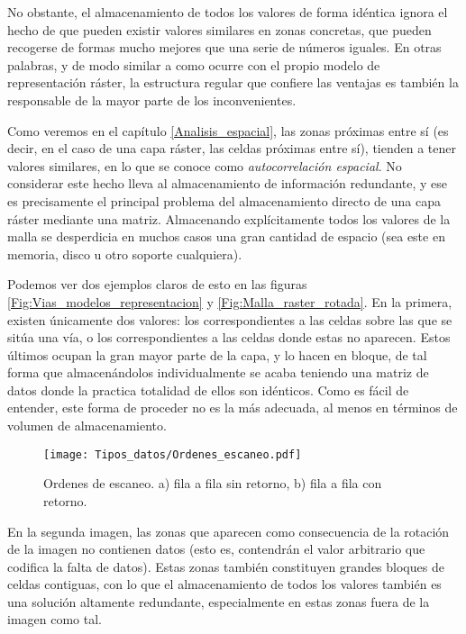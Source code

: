 \begin{multicols}{2}
No obstante, el almacenamiento de todos los valores de forma idéntica ignora el hecho de que pueden existir valores similares en zonas concretas, que pueden recogerse de formas mucho mejores que una serie de números iguales. En otras palabras, y de modo similar a como ocurre con el propio modelo de representación ráster, la estructura regular que confiere las ventajas es también la responsable de la mayor parte de los inconvenientes.

Como veremos en el capítulo \ref{Analisis_espacial}, las zonas próximas entre sí (es decir, en el caso de una capa ráster, las celdas próximas entre sí), tienden a tener valores similares, en lo que se conoce como \emph{autocorrelación espacial}. No considerar este hecho lleva al almacenamiento de información redundante, y ese es precisamente el principal problema del almacenamiento directo de una capa ráster mediante una matriz. Almacenando explícitamente todos los valores de la malla se desperdicia en muchos casos una gran cantidad de espacio (sea este en memoria, disco u otro soporte cualquiera).

Podemos ver dos ejemplos claros de esto en las figuras \ref{Fig:Vias_modelos_representacion} y \ref{Fig:Malla_raster_rotada}. En la primera, existen únicamente dos valores: los correspondientes a las celdas sobre las que se sitúa una vía, o los correspondientes a las celdas donde estas no aparecen. Estos últimos ocupan la gran mayor parte de la capa, y lo hacen en bloque, de tal forma que almacenándolos individualmente se acaba teniendo una matriz de datos donde la practica totalidad de ellos son idénticos. Como es fácil de entender, este forma de proceder no es la más adecuada, al menos en términos de volumen de almacenamiento.

\begin{figure*}[!ht]   
\centering
\texttt{[image: Tipos\_datos/Ordenes\_escaneo.pdf]}
\caption{\small Ordenes de escaneo. a) fila a fila sin retorno, b) fila a fila con retorno.}
\label{Fig:Orden_escaneo} 
\end{figure*}
 
En la segunda imagen, las zonas que aparecen como consecuencia de la rotación de la imagen no contienen datos (esto es, contendrán el valor arbitrario que codifica la falta de datos). Estas zonas también constituyen grandes bloques de celdas contiguas, con lo que el almacenamiento de todos los valores también es una solución altamente redundante, especialmente en estas zonas fuera de la imagen como tal.


\end{multicols}
